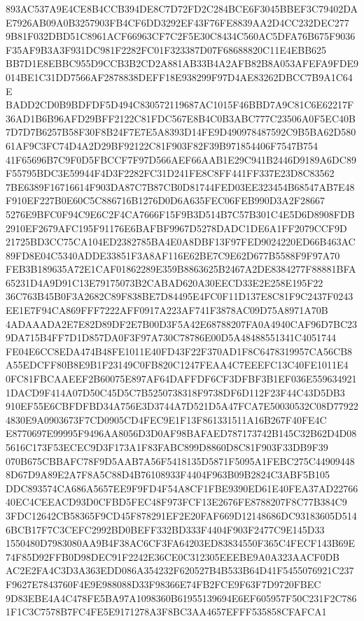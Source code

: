 \documentclass[UTF8,fontset=fandol,zihao=-4,a4paper]{ctexart}
\begin{document}
{{893AC537A9E4CE8B4CCB394DE8C7D72FD2C284BCE6F3045BBEF3C79402DAE7926AB09A0B3257903FB4CF6DD3292EF43F76FE8839AA2D4CC232DEC277
9B81F032DBD51C8961ACF66963CF7C2F5E30C8434C560AC5DFA76B675F9036F35AF9B3A3F931DC981F2282FC01F323387D07F68688820C11E4EBB625
BB7D1E8EBBC955D9CCB3B2CD2A881AB33B4A2AFB82B8A053AFEFA9FDE9014BE1C31DD7566AF2878838DEFF18E938299F97D4AE83262DBCC7B9A1C64E
BADD2CD0B9BDFDF5D494C830572119687AC1015F46BBD7A9C81C6E62217F36AD1B6B96AFD29BFF2122C81FDC567E8B4C0B3ABC777C23506A0F5EC40B
7D7D7B6257B58F30F8B24F7E7E5A8393D14FE9D490978487592C9B5BA62D58061AF9C3FC74D4A2D29BF92122C81F903F82F39B971854406F7547B754
41F65696B7C9F0D5FBCCF7F97D566AEF66AAB1E29C941B2446D9189A6DC89F55795BDC3E59944F4D3F2282FC31D241FE8C8FF441FF337E23D8C83562
7BE6389F16716614F903DA87C7B87CB0D81744FED03EE323454B68547AB7E48F910EF227B0E60C5C886716B1276D0D6A635FEC06FEB990D3A2F28667
5276E9BFC0F94C9E6C2F4CA7666F15F9B3D514B7C57B301C4E5D6D8908FDB2910EF2679AFC195F91176E6BAFBF9967D5278DADC1DE6A1FF2079CCF9D
21725BD3CC75CA104ED2382785BA4E0A8DBF13F97FED9024220ED66B463AC89FD8E04C5340ADDE33851F3A8AF116E62BE7C9E62D677B5588F9F97A70
FEB3B189635A72E1CAF01862289E359B8863625B2467A2DE8384277F88881BFA65231D4A9D91C13E79175073B2CABAD620A30EECD33E2E258E195F22
36C763B45B0F3A2682C89F838BE7D84495E4FC0F11D137E8C81F9C2437F0243EE1E7F94CA869FFF7222AFF0917A223AF741F3878AC09D75A8971A70B
4ADAAADA2E7E82D89DF2E7B00D3F5A42E68788207FA0A4940CAF96D7BC239DA715B4FF7D1D857DA0F3F97A730C78786E00D5A48488551341C4051744
FE04E6CC8EDA474B48FE1011E40FD43F22F370AD1F8C6478319957CA56CB8A55EDCFF80B8E9B1F23149C0FB820C1247FEAA4C7EEEFC13C40FE1011E4
0FC81FBCAAEEF2B60075E897AF64DAFFDF6CF3DFBF3B1EF036E5596349211DACD9F414A07D50C45D5C7B5250738318F9738DF6D112F23F44C43D5DB3
910EF55E6CBFDFBD34A756E3D3744A7D521D5A47FCA7E50030532C08D779224830E9A0903673F7CD0905CD4FEC9E1F13F861331511A16B267F40FE4C
E8770697E99995F9496AA8056D3D0AF98BAFAED787173742B145C32B62D4D085616C173F53ECEC9D3F173A1F83FABC899D8860D8C81F903F33DB9F39
070B675CBBAFC78F9D5AAB7A56F5418135D5871F5095A1FEBC275C449094488D67D9A89E2A7F8A5C88D4B76108933F4404F963B09B2824C3ABF5B105
DDC893574CA686A5657EE9F9FD4F54A8CF1FBE9390ED61E40FEA37AD2276640EC4CEEACD93D0CFBD5FEC48F973FCF13E2676FE8788207F8C77B384C9
3FDC12642CB58365F9CD45F878291EF2E20FAF669D12148686DC93183605D5146BCB17F7C3CEFC2992BD0BEFF332BD333F4404F903F2477C9E145D33
1550480D7983080AA9B4F38AC6CF3FA64203ED83834550F365C4FECF143B69E74F85D92FFB0D98DEC91F2242E36CE0C312305EEEBE9A0A323AACF0DB
AC2E2FA4C3D3A363EDD086A354232F620527B4B533B64D41F5455076921C237F9627E7843760F4E9E988088D33F98366E74FB2FCE9F63F7D9720FBEC
9D83EBE4A4C478FE5BA97A1098360B61955139694E6EF605957F50C231F2C7861F1C3C7578B7FC4FE5E9171278A3F8BC3AA4657EFFF535858CFAFCA1
}}
\end{document}
